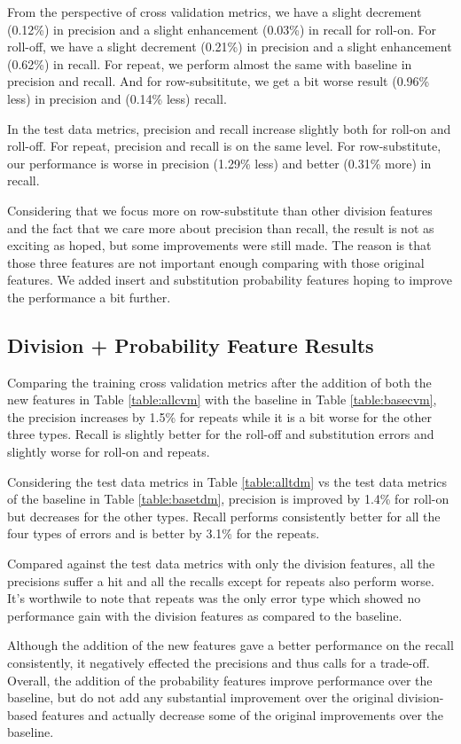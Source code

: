 \documentclass[letterpaper, 10 pt, conference]{ieeeconf}  %
\begin{document}
From the perspective of cross validation metrics, we have a slight decrement (0.12\%) in precision and a slight enhancement (0.03\%) in recall for roll-on. For roll-off,  we have a slight decrement (0.21\%) in precision and a slight enhancement (0.62\%) in recall. For repeat, we perform almost the same with baseline in precision and recall. And for row-subsititute, we get a bit worse result (0.96\% less) in precision and (0.14\% less) recall. 

In the test data metrics, precision and recall increase slightly both for roll-on and roll-off. For repeat, precision and recall is on the same level. For row-substitute, our performance is worse in precision (1.29\% less) and better (0.31\% more) in recall.

Considering that we focus more on row-substitute than other division features and the fact that we care more about precision than recall, the result is not as exciting as hoped, but some improvements were still made. The reason is that those three features are not important enough comparing with those original features. We added insert and substitution probability features hoping to improve the performance a bit further. 

\subsection{Division + Probability Feature Results}
Comparing the training cross validation metrics after the addition of both the new features in Table \ref{table:allcvm} with the baseline in Table \ref{table:basecvm}, the precision increases by 1.5\% for repeats while it is a bit worse for the other three types. Recall is slightly better for the roll-off and substitution errors and slightly worse for roll-on and repeats.

Considering the test data metrics in Table \ref{table:alltdm} vs the test data metrics of the baseline in Table \ref{table:basetdm}, precision is improved by 1.4\% for roll-on but decreases for the other types. Recall performs consistently better for all the four types of errors and is better by 3.1\% for the repeats.

Compared against the test data metrics with only the division features, all the precisions suffer a hit and all the recalls except for repeats also perform worse. It's worthwile to note that repeats was the only error type which showed no performance gain with the division features as compared to the baseline.

Although the addition of the new features gave a better performance on the recall consistently, it negatively effected the precisions and thus calls for a trade-off.  Overall, the addition of the probability features improve performance over the baseline, but do not add any substantial improvement over the original division-based features and actually decrease some of the original improvements over the baseline.
\end{document}
